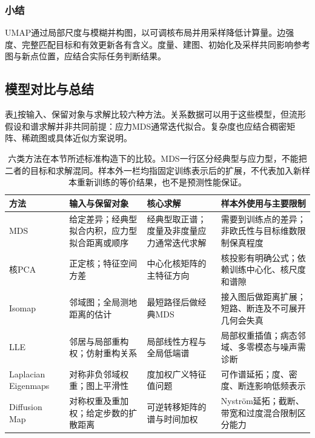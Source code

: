 \subsubsection{小结}

UMAP通过局部尺度与模糊并构图，以可调核布局并用采样降低计算量。边强度、完整匹配目标和有效更新各有含义。度量、建图、初始化及采样共同影响参考图与新点位置，应结合实际任务判断结果。

\subsection{模型对比与总结}
\label{sec:dim-manifold-comparison}
\label{sec:dim-neighbors-comparison}

表\ref{tab:dim-manifold-comparison}按输入、保留对象与求解比较六种方法。关系数据可以用于这些模型，但流形假设和谱求解并非共同前提：应力MDS通常迭代拟合。复杂度也应结合稠密矩阵、稀疏图或具体近似方案说明。

\begin{table}[htbp]
  \centering
  \small
  \begin{tabularx}{\linewidth}{@{}>{\RaggedRight\arraybackslash}p{22mm}>{\RaggedRight\arraybackslash}X>{\RaggedRight\arraybackslash}X>{\RaggedRight\arraybackslash}X@{}}
    \toprule
    方法 & 输入与保留对象 & 核心求解 & 样本外使用与主要限制 \\
    \midrule
    MDS & 给定差异；经典型拟合内积，应力型拟合距离或顺序
      & 经典型取正谱；度量及非度量应力通常迭代求解
      & 需要到训练点的差异；非欧氏性与目标维数限制保真程度 \\
    核PCA & 正定核；特征空间方差
      & 中心化核矩阵的主特征方向
      & 核投影有明确公式；依赖训练中心化、核尺度和谱隙 \\
    Isomap & 邻域图；全局测地距离的估计
      & 最短路径后做经典MDS
      & 接入图后做距离扩展；短路、断连及不可展开几何会失真 \\
    LLE & 邻居与局部重构权；仿射重构关系
      & 局部线性方程与全局低端谱
      & 局部权重插值；病态邻域、多零模态与噪声需诊断 \\
    Laplacian Eigenmaps & 对称非负邻域权重；图上平滑性
      & 度加权广义特征值问题
      & 可作谱延拓；度、密度、断连影响低频表示 \\
    Diffusion Map & 对称权重及重加权；给定步数的扩散距离
      & 可逆转移矩阵的谱与时间加权
      & Nystr\"om延拓；截断、带宽和过度混合限制区分能力 \\
    \bottomrule
  \end{tabularx}
  \caption{六类方法在本节所述标准构造下的比较。MDS一行区分经典型与应力型，不能把二者的目标和求解混同。样本外一栏均指固定训练表示后的扩展，不代表加入新样本重新训练的等价结果，也不是预测性能保证。}
  \label{tab:dim-manifold-comparison}
\end{table}

